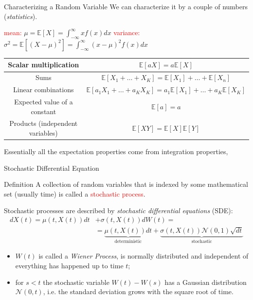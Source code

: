 \documentclass{beamer}
\begin{document}
\begin{frame}{Characterizing a Random Variable}
	We can characterize it by a couple of numbers (\emph{statistics}).
	\small{
		\begin{center}
			\textcolor{red}{mean:} $\boxed{\mu = \mathbb{E}[X] = \int_{-\infty}^{\infty} xf(x)dx}$\quad
			\textcolor{red}{variance:}  
			$\boxed{\sigma^2 = \mathbb{E}[(X-\mu)^2] =\int_{-\infty}^{\infty} (x-\mu)^2f(x)dx}$
	\end{center}
}
	\renewcommand{\arraystretch}{1.4}
{\tiny {\tiny }}{
	\begin{table}[bt]
		\begin{tabular}{|c|c|} \hline
			Scalar multiplication & $\mathbb{E}[aX] = a\mathbb{E}[X]$ \\ \hline
			Sums & $\mathbb{E}[X_1+\ldots +X_K] =  \mathbb{E}[X_1] +\ldots + \mathbb{E}[X_n]$ \\ \hline
			Linear combinations & $\mathbb{E}[a_1X_1+\ldots +a_KX_K] =  a_1\mathbb{E}[X_1] +\ldots + a_K\mathbb{E}[X_K]$ \\ \hline
			Expected value of a constant & $\mathbb{E}[a] = a$ \\ \hline
			Products (independent variables) & $\mathbb{E}[XY] = \mathbb{E}[X] \mathbb{E}[Y]$ \\ \hline
		\end{tabular}
	\end{table}
}
Essentially all the expectation properties come from integration properties,
\end{frame}

\begin{frame}{Stochastic Differential Equation}
\begin{block}{Definition}
A collection of random variables that is indexed by some mathematical set (usually time) is called a \textcolor{red}{stochastic process}.
\end{block}
Stochastic processes are described by \emph{stochastic differential equations} (SDE):	
	\begin{equation}
		\begin{aligned}
			dX(t) = \mu(t,X(t)) dt &+ \sigma(t,X(t)) dW(t) =\\  & =\underbrace{\mu(t,X(t))dt}_{\textrm{deterministic}} + \underbrace{\sigma(t,X(t)) \mathcal{N}(0,1)\sqrt{dt}}_{\textrm{stochastic}}
		\end{aligned}
	\label{eq:sde}
	\end{equation}
	
\begin{itemize}
\item $W(t)$ is called a \emph{Wiener Process}, is normally distributed and independent of everything has happened up to time $t$;
\item for $s< t$ the stochastic variable $W(t)-W(s)$ has a Gaussian distribution $\mathcal{N}(0, t)$, i.e. the standard deviation grows with the square root of time.
\end{itemize}  
\end{frame}
\end{document}
